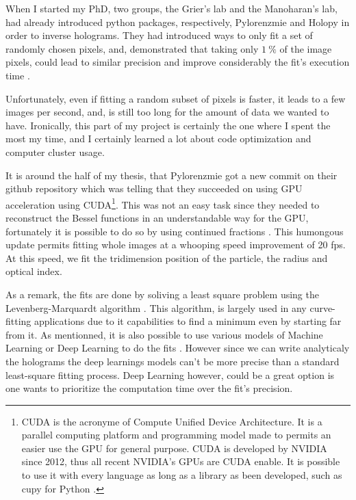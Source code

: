 When I started my PhD, two groups, the Grier's lab and the Manoharan's lab, had already introduced python packages, respectively, Pylorenzmie and Holopy in order to inverse holograms. They had introduced ways to only fit a set of randomly chosen pixels, and, demonstrated that taking only $1~\%$ of the image pixels, could lead to similar precision and improve considerably the fit's execution time \cite{dimiduk_random-subset_2014}.
 
 Unfortunately, even if fitting  a random subset of pixels is faster, it leads to a few images per second, and, is still too long for the amount of data we wanted to have. Ironically, this part of my project is certainly the one where I spent the most my time, and I certainly learned a lot about code optimization and computer cluster usage. 
 
 It is around the half of my thesis, that Pylorenzmie got a new commit on their github repository which was telling that they succeeded on using GPU acceleration using CUDA\footnote{CUDA is the acronyme of Compute Unified Device Architecture. It is a parallel computing platform and programming model made to permits an easier use the GPU for general purpose. CUDA is developed by NVIDIA since 2012, thus all recent NVIDIA's GPUs are CUDA enable. It is possible to use it with every language as long as a library as been developed, such as cupy for Python \href{https://github.com/cupy/cupy}{\faGithub}.}. This was not an easy task since they needed to reconstruct the Bessel functions in an understandable way for the GPU, fortunately it is possible to do so by using continued fractions \cite{lentz_generating_1976}. This humongous update permits fitting whole images at a whooping speed improvement of 20 fps. At this speed, we fit the tridimension position of the particle, the radius and optical index. 
 
 As a remark, the fits are done by soliving a least square problem using the Levenberg-Marquardt algorithm \cite{more_levenberg-marquardt_1978}. This algorithm, is largely used in any curve-fitting applications due to it capabilities to find a minimum even by starting far from it. As mentionned, it is also possible to use various models of Machine Learning or Deep Learning to do the fits \cite{altman_catch_2020}. However since we can write analyticaly the holograms the deep learnings models can't be more precise than a standard least-square fitting process. Deep Learning however, could be a great option is one wants to prioritize the computation time over the fit's precision.
 
